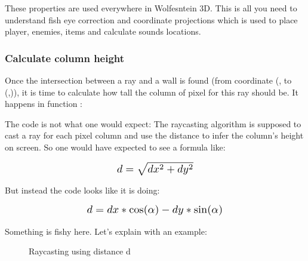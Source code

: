 \par
\begin{figure}[H]
\centering
 
\end{figure}



These properties are used everywhere in Wolfesntein 3D. This is all you need to understand fish eye correction and coordinate projections which is used to place player, enemies, items and calculate sounds locations.\\






\subsubsection{Calculate column height}
Once the intersection between a ray and a wall is found (from coordinate (, to (,)), it is time to calculate how tall the column of pixel for this ray should be. It happens in function :\\

\begin{minipage}{\textwidth}

\end{minipage}

The code is not what one would expect: The raycasting algorithm is supposed to cast a ray for each pixel column and use the distance  to infer the column's height on screen. So one would have expected to see a formula like:
\begin{figure}[H]
  \centering
  \begin{equation*}
    \scalebox{1.3}{
$ d = \sqrt{dx^2 + dy^2}$ 
 }
  \end{equation*}
\end{figure}
But instead the code looks like it is doing: 
\begin{figure}[H]
  \centering
  \begin{equation*}
    \scalebox{1.3}{
$d = dx * \cos(\alpha) - dy * \sin(\alpha) $
 }
  \end{equation*}
\end{figure}
Something is fishy here. Let's explain with an example:\\
\par
\begin{figure}[H]
\centering
 
 \caption{Raycasting using distance d} \label{fig:Raycasting2}
\end{figure}

